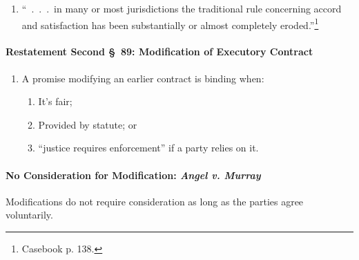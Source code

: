 \begin{enumerate}
\begin{enumerate}
        \item \emph{Performance}: if an accord involving a different 
        performance is executed, the original contractual obligations are 
        discharged.
        \item \emph{Suspension of old contract}: ``an executory accord 
        operates to suspend A's rights under the original contract during the 
        period in which B is supposed to perform the 
        accord.''\footnote{Casebook p. 137.}
        \item If one party fails to perform under the accord, the other party 
        can sue under either the new accord or the old contract.
    \end{enumerate}
    \item ``~.~.~.~in many or most jurisdictions the traditional rule 
    concerning accord and satisfaction has been substantially or almost 
    completely eroded.''\footnote{Casebook p. 138.}
\end{enumerate}

\paragraph{Restatement Second \S\ 89: Modification of Executory Contract}

\begin{enumerate}
    \item A promise modifying an earlier contract is binding when:
    \begin{enumerate}
        \item It's fair;
        \item Provided by statute; or
        \item ``justice requires enforcement'' if a party relies on it.
    \end{enumerate}
\end{enumerate}

\paragraph{No Consideration for Modification: \emph{Angel v. Murray}}

Modifications do not require consideration as long as the parties agree 
voluntarily.

